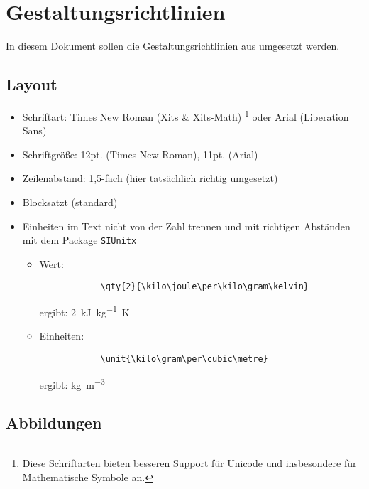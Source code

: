 




\tableofcontents

\newpage

\section{Gestaltungsrichtlinien}

In diesem Dokument sollen die Gestaltungsrichtlinien aus  umgesetzt werden.

\subsection{Layout}

\begin{itemize}
	\item Schriftart: Times New Roman (Xits \& Xits-Math) \footnote{Diese Schriftarten bieten besseren Support für Unicode und insbesondere für Mathematische Symbole an.} oder Arial (Liberation Sans)
	\item Schriftgröße: 12pt. (Times New Roman), 11pt. (Arial)
	\item Zeilenabstand: 1,5-fach (hier tatsächlich richtig umgesetzt)
	\item Blocksatzt (standard)
	\item Einheiten im Text nicht von der Zahl trennen und mit richtigen Abständen mit dem Package \texttt{SIUnitx}

	\begin{itemize}
		\item Wert:\begin{verbatim}
			\qty{2}{\kilo\joule\per\kilo\gram\kelvin}
		\end{verbatim} 
		ergibt: \qty{2}{\kilo\joule\per\kilo\gram\kelvin} 	
		\item Einheiten: \begin{verbatim}
			\unit{\kilo\gram\per\cubic\metre}
		\end{verbatim}
		ergibt: \unit{\kilo\gram\per\cubic\metre}
	\end{itemize}
	
\end{itemize}

\subsection{Abbildungen}

